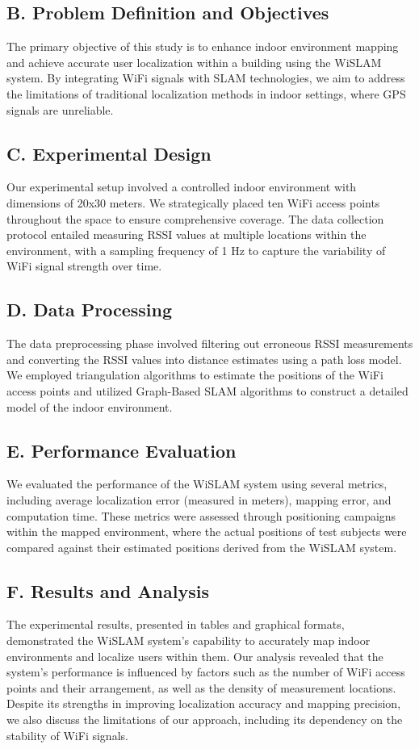 \documentclass[
	a4paper, %
	11pt, %
	unnumberedsections, %
	twoside, %
]{LTJournalArticle}
\begin{document}
\subsection{B.	Problem Definition and Objectives}
The primary objective of this study is to enhance indoor environment mapping and achieve accurate user localization within a building using the WiSLAM system. By integrating WiFi signals with SLAM technologies, we aim to address the limitations of traditional localization methods in indoor settings, where GPS signals are unreliable.

\subsection{C.	Experimental Design}
Our experimental setup involved a controlled indoor environment with dimensions of 20x30 meters. We strategically placed ten WiFi access points throughout the space to ensure comprehensive coverage. The data collection protocol entailed measuring RSSI values at multiple locations within the environment, with a sampling frequency of 1 Hz to capture the variability of WiFi signal strength over time.

\subsection{D.	Data Processing}
The data preprocessing phase involved filtering out erroneous RSSI measurements and converting the RSSI values into distance estimates using a path loss model. We employed triangulation algorithms to estimate the positions of the WiFi access points and utilized Graph-Based SLAM algorithms to construct a detailed model of the indoor environment.

\subsection{E.	Performance Evaluation}
We evaluated the performance of the WiSLAM system using several metrics, including average localization error (measured in meters), mapping error, and computation time. These metrics were assessed through positioning campaigns within the mapped environment, where the actual positions of test subjects were compared against their estimated positions derived from the WiSLAM system.

\subsection{F.	Results and Analysis}
The experimental results, presented in tables and graphical formats, demonstrated the WiSLAM system's capability to accurately map indoor environments and localize users within them. Our analysis revealed that the system's performance is influenced by factors such as the number of WiFi access points and their arrangement, as well as the density of measurement locations. Despite its strengths in improving localization accuracy and mapping precision, we also discuss the limitations of our approach, including its dependency on the stability of WiFi signals.
\end{document}
